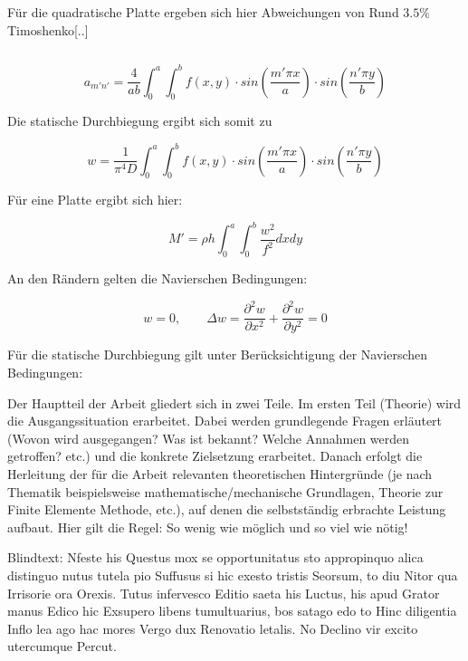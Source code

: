 Für die quadratische Platte ergeben sich hier Abweichungen von Rund $3.5\%$ Timoshenko[..]




$$$$


\begin{equation}
a_{m'n'} = \dfrac{4}{ab} \int_{0}^{a} \int_{0}^{b} f(x,y)\cdot sin\left(\dfrac{m' \pi x}{a}\right) \cdot sin\left(\dfrac{n' \pi y}{b}\right)
\end{equation}
	


Die statische Durchbiegung ergibt sich somit zu


\begin{equation}
w = \dfrac{1}{\pi^4 D} \int_{0}^{a} \int_{0}^{b} f(x,y)\cdot sin\left(\dfrac{m' \pi x}{a}\right) \cdot sin\left(\dfrac{n' \pi y}{b}\right)
\end{equation}

 



Für eine Platte ergibt sich hier:

$$M'=\rho h \int_0^a \int_0^b \dfrac{w^2}{f^2} dx dy$$

An den Rändern gelten die Navierschen Bedingungen:

\begin{equation} 
\tag{$x$ = 0, a ; \quad  $y=0, b$}w = 0, \qquad \Delta w = \dfrac{\partial^2 w}{\partial x^2} + \dfrac{\partial^2 w}{\partial y^2} = 0
 \end{equation}

Für die statische Durchbiegung gilt unter Berücksichtigung der Navierschen Bedingungen:






Der Hauptteil der Arbeit gliedert sich in zwei Teile. Im ersten Teil (Theorie) wird die Ausgangssituation erarbeitet. Dabei werden grundlegende Fragen erläutert (Wovon wird ausgegangen? Was ist bekannt? Welche Annahmen werden getroffen? etc.) und die konkrete Zielsetzung erarbeitet. Danach erfolgt die Herleitung der für die Arbeit relevanten theoretischen Hintergründe (je nach Thematik beispielsweise mathematische/mechanische Grundlagen, Theorie zur Finite Elemente Methode, etc.), auf denen die selbstständig erbrachte Leistung aufbaut. Hier gilt die Regel: So wenig wie möglich und so viel wie nötig! 

Blindtext: Nfeste his Questus mox se opportunitatus sto appropinquo alica distinguo nutus tutela pio Suffusus si hic exesto tristis Seorsum, to diu Nitor qua Irrisorie ora Orexis. Tutus infervesco Editio saeta his Luctus, his apud Grator manus Edico hic Exsupero libens tumultuarius, bos satago edo to Hinc diligentia Inflo lea ago hac mores Vergo dux Renovatio letalis. No Declino vir excito utercumque Percut.
